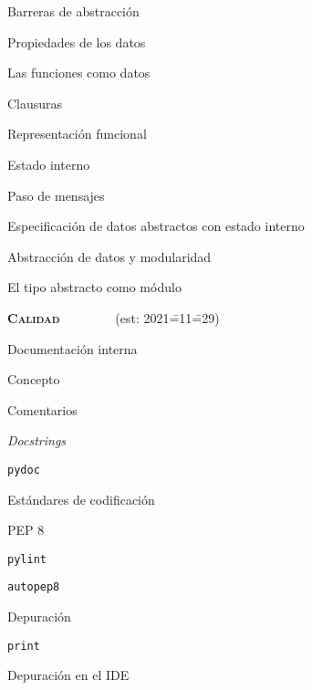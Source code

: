 \begin{longenum}
\begin{longenum}
\begin{longenum}
            \item Barreras de abstracción
            \item Propiedades de los datos
        \end{longenum}
        \item Las funciones como datos
        \begin{longenum}
            \item Clausuras
            \item Representación funcional
            \item Estado interno
            \item Paso de mensajes
            \item Especificación de datos abstractos con estado interno
        \end{longenum}
        \item Abstracción de datos y modularidad
        \begin{longenum}
            \item El tipo abstracto como módulo
        \end{longenum}
    \end{longenum}
    \item \textbf{\textsc{Calidad}} \ \ \ \ \ \ \ \ (est: 2021\==11\==29)
    \begin{longenum}
        \item Documentación interna
        \begin{longenum}
            \item Concepto
            \item Comentarios
            \item \textit{Docstrings}
            \item \texttt{pydoc}
            \item Estándares de codificación
            \begin{longenum}
                \item PEP 8
                \item \texttt{pylint}
                \item \texttt{autopep8}
            \end{longenum}
        \end{longenum}
        \item Depuración
        \begin{longenum}
            \item \texttt{print}
            \item Depuración en el IDE

\end{longenum}
\end{longenum}
\end{longenum}
